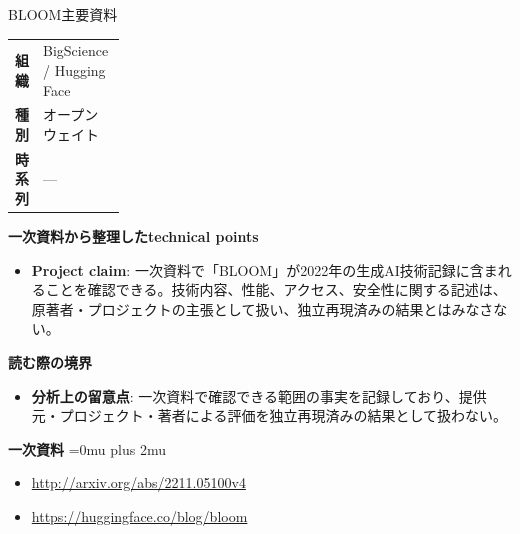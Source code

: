 \begin{technicalnote}{BLOOM}{主要資料}
\begingroup
\begin{tabularx}{\linewidth}{@{}>{\bfseries}p{0.22\linewidth}X@{}}
組織 & BigScience / Hugging Face \\
種別 & オープンウェイト \\
時系列 & — \\
\end{tabularx}
\smallskip
{\bfseries 一次資料から整理したtechnical points}
\begin{itemize}[leftmargin=1.5em,itemsep=0.35em]
\item \textbf{Project claim}: 一次資料で「BLOOM」が2022年の生成AI技術記録に含まれることを確認できる。技術内容、性能、アクセス、安全性に関する記述は、原著者・プロジェクトの主張として扱い、独立再現済みの結果とはみなさない。
\end{itemize}
\begin{minipage}{\linewidth}
{\bfseries 読む際の境界}
\begin{itemize}[leftmargin=1.5em,itemsep=0.35em]
\item \textbf{分析上の留意点}: 一次資料で確認できる範囲の事実を記録しており、提供元・プロジェクト・著者による評価を独立再現済みの結果として扱わない。
\end{itemize}
\begin{samepage}
{\bfseries 一次資料}
\begingroup\sloppy
\Urlmuskip=0mu plus 2mu\relax
\begin{itemize}[leftmargin=1.5em,itemsep=0.25em]
\item {\scriptsize\url{http://arxiv.org/abs/2211.05100v4}}
\item {\scriptsize\url{https://huggingface.co/blog/bloom}}
\end{itemize}
\endgroup
\end{samepage}
\end{minipage}
\endgroup
\end{technicalnote}
\medskip

